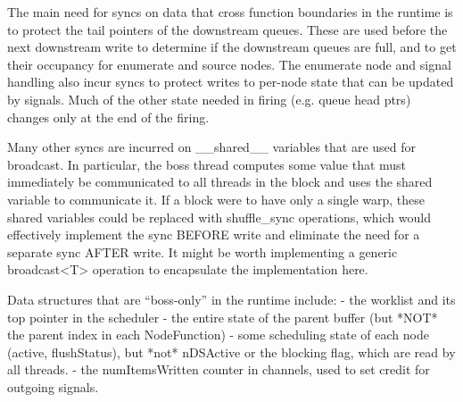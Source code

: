 The main need for syncs on data that cross function boundaries in the
runtime is to protect the tail pointers of the downstream
queues. These are used before the next downstream write to determine
if the downstream queues are full, and to get their occupancy for
enumerate and source nodes.  The enumerate node and signal handling
also incur syncs to protect writes to per-node state that can be
updated by signals.  Much of the other state needed in firing
(e.g. queue head ptrs) changes only at the end of the firing.

Many other syncs are incurred on __shared__ variables that are used
for broadcast.  In particular, the boss thread computes some value
that must immediately be communicated to all threads in the block and
uses the shared variable to communicate it.  If a block were to have
only a single warp, these shared variables could be replaced with
shuffle_sync operations, which would effectively implement the sync
BEFORE write and eliminate the need for a separate sync AFTER write.
It might be worth implementing a generic broadcast<T> operation to
encapsulate the implementation here.

Data structures that are ``boss-only'' in the runtime include:
 - the worklist and its top pointer in the scheduler
 - the entire state of the parent buffer (but *NOT* the parent index
   in each NodeFunction)
 - some scheduling state of each node (active, flushStatus), but *not*
   nDSActive or the blocking flag, which are read by all threads.
 - the numItemsWritten counter in channels, used to set credit for
   outgoing signals.
